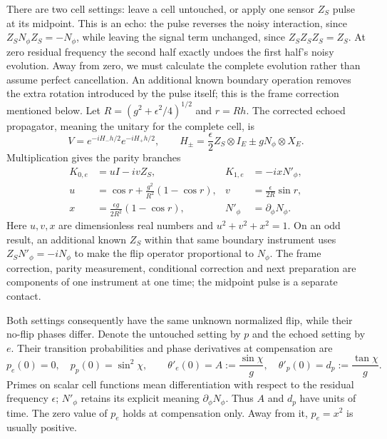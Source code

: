 \documentclass[11pt,a4paper]{article}
\numberwithin{equation}{section}
\theoremstyle{remark}
\begin{document}
There are two cell settings: leave a cell untouched, or apply one sensor
$Z_S$ pulse at its midpoint. This is an echo: the pulse reverses the noisy
interaction, since $Z_SN_\phi Z_S=-N_\phi$, while leaving the signal term
unchanged, since $Z_SZ_SZ_S=Z_S$. At zero residual frequency the second half
exactly undoes the first half's noisy evolution. Away from zero, we must
calculate the complete evolution rather than assume perfect cancellation.
An additional known boundary operation removes the extra rotation introduced
by the pulse itself; this is the frame correction mentioned below. Let
$R=(g^2+\epsilon^2/4)^{1/2}$ and $r=Rh$. The corrected echoed
propagator, meaning the unitary for the complete cell, is
\begin{equation}
 V=e^{-iH_-h/2}e^{-iH_+h/2},\qquad
 H_\pm=\frac{\epsilon}{2}Z_S\otimes I_E
       \pm gN_\phi\otimes X_E.
\end{equation}
Multiplication gives the parity branches
\begin{align}
 K_{0,e}&=uI-ivZ_S,& K_{1,e}&=-ixN'_\phi,\label{time:echo}\\
 u&=\cos r+\frac{g^2}{R^2}(1-\cos r),&
 v&=\frac{\epsilon}{2R}\sin r,\nonumber\\
 x&=\frac{\epsilon g}{2R^2}(1-\cos r),&
 N'_\phi&=\partial_\phi N_\phi .\nonumber
\end{align}
Here $u,v,x$ are dimensionless real numbers and $u^2+v^2+x^2=1$.
On an odd result, an additional known $Z_S$ within that same boundary
instrument uses $Z_SN'_\phi=-iN_\phi$ to make the flip operator proportional
to $N_\phi$. The frame correction, parity measurement, conditional correction
and next preparation are components of one instrument at one time; the
midpoint pulse is a separate contact.

Both settings consequently have the same unknown normalized flip, while
their no-flip phases differ. Denote the untouched setting by $p$ and the
echoed setting by $e$. Their transition probabilities and phase derivatives
at compensation are
\begin{equation}
 p_e(0)=0,\quad p_p(0)=\sin^2\chi,\qquad
 \theta'_e(0)=A:=\frac{\sin\chi}{g},\quad
 \theta'_p(0)=d_p:=\frac{\tan\chi}{g}.
 \label{time:echoderivatives}
\end{equation}
Primes on scalar cell functions mean differentiation with respect to the
residual frequency $\epsilon$; $N'_\phi$ retains its explicit meaning
$\partial_\phi N_\phi$. Thus $A$ and $d_p$ have units of time. The zero
value of $p_e$ holds at compensation only. Away from it, $p_e=x^2$ is usually
positive.
\end{document}
